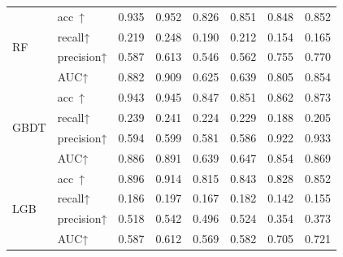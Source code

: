 \begin{table}[H]
{{\begin{tabular}{llllllll}
				\multirow{4}{*}{RF}             & acc~↑                    & 0.935 & 0.952                          & 0.826 & 0.851                                                                                    & 0.848 & 0.852                         \\
				& recall↑                  & 0.219 & 0.248                          & 0.190 & 0.212                                                                                    & 0.154 & 0.165                         \\
				& precision↑               & 0.587 & 0.613                          & 0.546 & 0.562                                                                                    & 0.755 & 0.770                         \\
				& AUC↑                     & 0.882 & 0.909                          & 0.625 & 0.639                                                                                    & 0.805 & 0.854                         \\
				\multirow{4}{*}{GBDT}           & acc~↑                    & 0.943 & 0.945                          & 0.847 & 0.851                                                                                    & 0.862 & 0.873                         \\
				& recall↑                  & 0.239 & 0.241                          & 0.224 & 0.229                                                                                    & 0.188 & 0.205                         \\
				& precision↑               & 0.594 & 0.599                          & 0.581 & 0.586                                                                                    & 0.922 & 0.933                         \\
				& AUC↑                     & 0.886 & 0.891                          & 0.639 & 0.647                                                                                    & 0.854 & 0.869                         \\
				\multirow{4}{*}{LGB}            & acc~↑                    & 0.896 & 0.914                          & 0.815 & 0.843                                                                                    & 0.828 & 0.852                         \\
				& recall↑                  & 0.186 & 0.197                          & 0.167 & 0.182                                                                                    & 0.142 & 0.155                         \\
				& precision↑               & 0.518 & 0.542                          & 0.496 & 0.524                                                                                    & 0.354 & 0.373                         \\
				& AUC↑                     & 0.587 & 0.612                          & 0.569 & 0.582                                                                                    & 0.705 & 0.721                         \\
				\bottomrule[1.5pt]
			\end{tabular}
		}
	}
\end{table}
